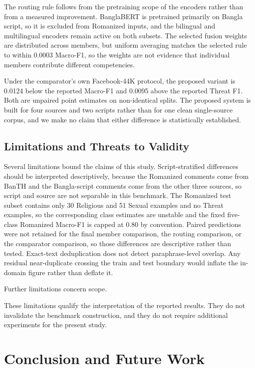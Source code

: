 \documentclass[11pt,a4paper]{article}
\begin{document}
The routing rule follows from the pretraining scope of the encoders rather than from a measured improvement. BanglaBERT is pretrained primarily on Bangla script, so it is excluded from Romanized inputs, and the bilingual and multilingual encoders remain active on both subsets. The selected fusion weights are distributed across members, but uniform averaging matches the selected rule to within 0.0003 Macro-F1, so the weights are not evidence that individual members contribute different competencies.

Under the comparator's own Facebook-44K protocol, the proposed variant is 0.0124 below the reported Macro-F1 and 0.0095 above the reported Threat F1. Both are unpaired point estimates on non-identical splits. The proposed system is built for four sources and two scripts rather than for one clean single-source corpus, and we make no claim that either difference is statistically established.


\subsection{Limitations and Threats to Validity}
\label{sec:limitations}

Several limitations bound the claims of this study. Script-stratified differences should be interpreted descriptively, because the Romanized comments come from BanTH and the Bangla-script comments come from the other three sources, so script and source are not separable in this benchmark. The Romanized test subset contains only 30 Religious and 51 Sexual examples and no Threat examples, so the corresponding class estimates are unstable and the fixed five-class Romanized Macro-F1 is capped at 0.80 by convention. Paired predictions were not retained for the final member comparison, the routing comparison, or the comparator comparison, so those differences are descriptive rather than tested. Exact-text deduplication does not detect paraphrase-level overlap. Any residual near-duplicate crossing the train and test boundary would inflate the in-domain figure rather than deflate it.

Further limitations concern scope.

These limitations qualify the interpretation of the reported results. They do not invalidate the benchmark construction, and they do not require additional experiments for the present study.


\section{Conclusion and Future Work}
\label{sec:conclusion}
\end{document}
